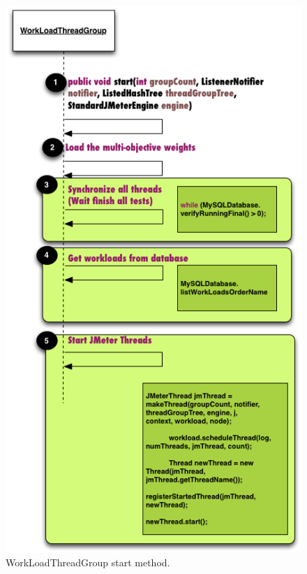 \documentclass[espaco=umemeio,chapter=TITLE,twoside,openright]{abnt}
\begin{document}
\begin{figure}[h]
\begin{minipage}{.5\textwidth}
\centering
\includegraphics[width=1\textwidth]{./images/startthreads.png}
\caption{WorkLoadThreadGroup start method.}
\label{fig:startmethod}
\end{minipage}
\begin{minipage}{.5\textwidth}
\centering

\end{minipage}
\end{figure}
\end{document}
